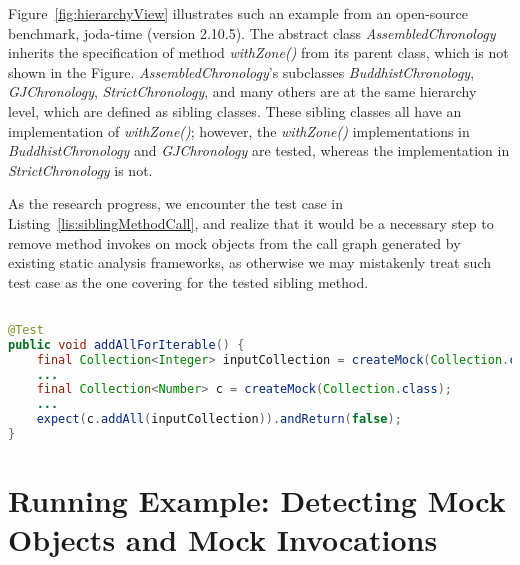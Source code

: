 Figure~\ref{fig:hierarchyView} illustrates such an example from an open-source benchmark, joda-time (version 2.10.5). The abstract class \textit{AssembledChronology} inherits the specification of method \textit{withZone()} from its parent class, which is not shown in the Figure. \textit{AssembledChronology}'s subclasses \textit{BuddhistChronology}, \textit{GJChronology}, \textit{StrictChronology}, and many others are at the same hierarchy level, which are defined as sibling classes. These sibling classes all have an implementation of \textit{withZone()}; however, the \textit{withZone()} implementations in \textit{BuddhistChronology} and \textit{GJChronology} are tested, whereas the implementation in \textit{StrictChronology} is not.

As the research progress, we encounter the test case in Listing~\ref{lis:siblingMethodCall}, and realize that it would be a necessary step to remove method invokes on mock objects from the call graph generated by existing static analysis frameworks, as otherwise we may mistakenly treat such test case as the one covering for the tested sibling method.

\begin{lstlisting}[basicstyle=\ttfamily, caption={This code snippet illustrates an example from commons-collections4, where the method \textit{addAll()} invoked on the mock object \texttt{c} could be mistreated as a focal method being covered by existing static analysis frameworks.},
basicstyle=\ttfamily,language = Java, framesep=4.5mm, escapechar=|,
framexleftmargin=1.0mm, captionpos=b, label=lis:siblingMethodCall, morekeywords={@Test}]

@Test
public void addAllForIterable() {
	final Collection<Integer> inputCollection = createMock(Collection.class);
	...
	final Collection<Number> c = createMock(Collection.class);
	...
	expect(c.addAll(inputCollection)).andReturn(false);
}
\end{lstlisting}

\section{Running Example: Detecting Mock Objects and Mock Invocations}

